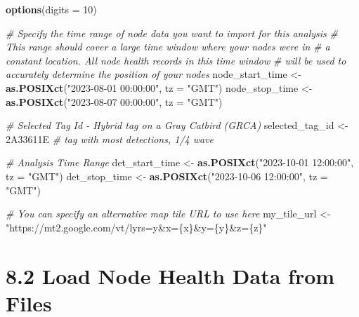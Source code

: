 \documentclass[
]{book}
\newenvironment{Shaded}{\begin{snugshade}}{\end{snugshade}}
\newcommand{\AttributeTok}[1]{\textcolor[rgb]{0.13,0.29,0.53}{#1}}
\newcommand{\CommentTok}[1]{\textcolor[rgb]{0.56,0.35,0.01}{\textit{#1}}}
\newcommand{\DecValTok}[1]{\textcolor[rgb]{0.00,0.00,0.81}{#1}}
\newcommand{\FunctionTok}[1]{\textcolor[rgb]{0.13,0.29,0.53}{\textbf{#1}}}
\newcommand{\NormalTok}[1]{#1}
\newcommand{\OtherTok}[1]{\textcolor[rgb]{0.56,0.35,0.01}{#1}}
\newcommand{\StringTok}[1]{\textcolor[rgb]{0.31,0.60,0.02}{#1}}
\begin{document}
\begin{Shaded}
\begin{Highlighting}[]
\FunctionTok{options}\NormalTok{(}\AttributeTok{digits =} \DecValTok{10}\NormalTok{)}

\CommentTok{\# Specify the time range of node data you want to import for this analysis}
\CommentTok{\#   This range should cover a large time window where your nodes were in}
\CommentTok{\#   a constant location.  All node health records in this time window}
\CommentTok{\#   will be used to accurately determine the position of your nodes}
\NormalTok{node\_start\_time }\OtherTok{\textless{}{-}} \FunctionTok{as.POSIXct}\NormalTok{(}\StringTok{"2023{-}08{-}01 00:00:00"}\NormalTok{, }\AttributeTok{tz =} \StringTok{"GMT"}\NormalTok{)}
\NormalTok{node\_stop\_time }\OtherTok{\textless{}{-}} \FunctionTok{as.POSIXct}\NormalTok{(}\StringTok{"2023{-}08{-}07 00:00:00"}\NormalTok{, }\AttributeTok{tz =} \StringTok{"GMT"}\NormalTok{)}

\CommentTok{\# Selected Tag Id {-} Hybrid tag on a Gray Catbird (GRCA)}
\NormalTok{selected\_tag\_id }\OtherTok{\textless{}{-}} \StringTok{\textquotesingle{}2A33611E\textquotesingle{}} \CommentTok{\# tag with most detections, 1/4 wave}

\CommentTok{\# Analysis Time Range}
\NormalTok{det\_start\_time }\OtherTok{\textless{}{-}} \FunctionTok{as.POSIXct}\NormalTok{(}\StringTok{"2023{-}10{-}01 12:00:00"}\NormalTok{, }\AttributeTok{tz =} \StringTok{"GMT"}\NormalTok{)}
\NormalTok{det\_stop\_time }\OtherTok{\textless{}{-}} \FunctionTok{as.POSIXct}\NormalTok{(}\StringTok{"2023{-}10{-}06 12:00:00"}\NormalTok{, }\AttributeTok{tz =} \StringTok{"GMT"}\NormalTok{)}

\CommentTok{\# You can specify an alternative map tile URL to use here}
\NormalTok{my\_tile\_url }\OtherTok{\textless{}{-}} \StringTok{"https://mt2.google.com/vt/lyrs=y\&x=\{x\}\&y=\{y\}\&z=\{z\}"}
\end{Highlighting}
\end{Shaded}

\section{8.2 Load Node Health Data from Files}\label{load-node-health-data-from-files-1}
\end{document}
